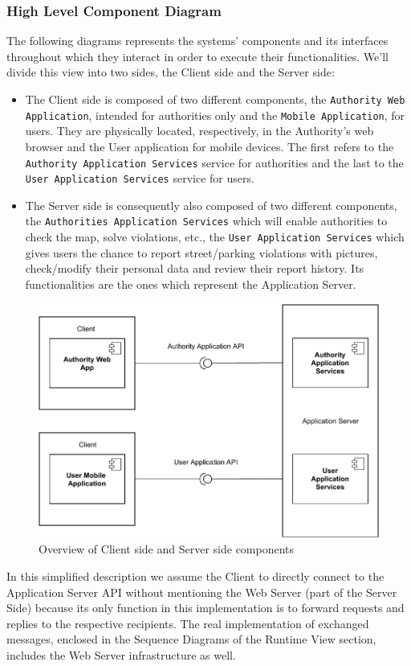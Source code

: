 \documentclass[12pt,a4paper]{article}
\begin{document}
\subsubsection{High Level Component Diagram}
The following diagrams represents the systems' components and its interfaces throughout which they interact in order to execute their functionalities. We'll divide this view into two sides, the Client side and the Server side:
\begin{itemize}
\item The Client side is composed of two different components, 
the \texttt{Authority Web Application}, intended for authorities only and 
the \texttt{Mobile Application}, for users. They are physically located, respectively, in the Authority's web browser and the User application for mobile devices.
The first refers to the \texttt{Authority Application Services} service for authorities and 
the last to the \texttt{User Application Services} service for users.
\item The Server side is consequently also composed of two different components, the \texttt{Authorities Application Services} which will enable authorities to check the map, solve violations, etc., the \texttt{User Application Services} which gives users the chance to report street/parking violations with pictures, check/modify their personal data and review their report history. Its functionalities are the ones which represent the Application Server.
\end{itemize}
\begin{figure}[H]
		\centering
		\includegraphics[width=1.0\linewidth]{../assets/images/component_no3rdparty.pdf}
		\caption{Overview of Client side and Server side components}
	\end{figure}
In this simplified description we assume the Client to directly connect to the Application Server API without mentioning the Web Server (part of the Server Side) because its only function in this implementation is to forward requests and replies to the respective recipients.
The real implementation of exchanged messages, enclosed in the Sequence Diagrams of the Runtime View section, includes the Web Server infrastructure as well.
\newpage
\end{document}
